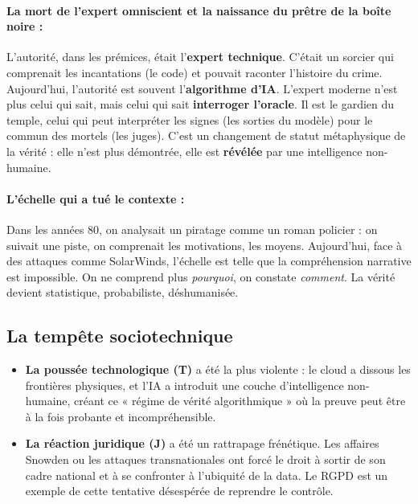 \documentclass[12pt]{article}
\begin{document}
\paragraph{La mort de l'expert omniscient et la naissance du prêtre de la boîte noire :}
L'autorité, dans les prémices, était l'\textbf{expert technique}. C'était un sorcier qui comprenait les incantations (le code) et pouvait raconter l'histoire du crime. Aujourd'hui, l'autorité est souvent l'\textbf{algorithme d'IA}. L'expert moderne n'est plus celui qui sait, mais celui qui sait \textbf{interroger l'oracle}. Il est le gardien du temple, celui qui peut interpréter les signes (les sorties du modèle) pour le commun des mortels (les juges). C'est un changement de statut métaphysique de la vérité : elle n'est plus démontrée, elle est \textbf{révélée} par une intelligence non-humaine.

\paragraph{L'échelle qui a tué le contexte :}
Dans les années 80, on analysait un piratage comme un roman policier : on suivait une piste, on comprenait les motivations, les moyens. Aujourd'hui, face à des attaques comme SolarWinds, l'échelle est telle que la compréhension narrative est impossible. On ne comprend plus \emph{pourquoi}, on constate \emph{comment}. La vérité devient statistique, probabiliste, déshumanisée.

\subsection{La tempête sociotechnique}

\begin{itemize}
\item \textbf{La poussée technologique (T)} a été la plus violente : le cloud a dissous les frontières physiques, et l'IA a introduit une couche d'intelligence non-humaine, créant ce « régime de vérité algorithmique » où la preuve peut être à la fois probante et incompréhensible.

\item \textbf{La réaction juridique (J)} a été un rattrapage frénétique. Les affaires Snowden ou les attaques transnationales ont forcé le droit à sortir de son cadre national et à se confronter à l'ubiquité de la data. Le RGPD est un exemple de cette tentative désespérée de reprendre le contrôle.
\end{itemize}
\end{document}
